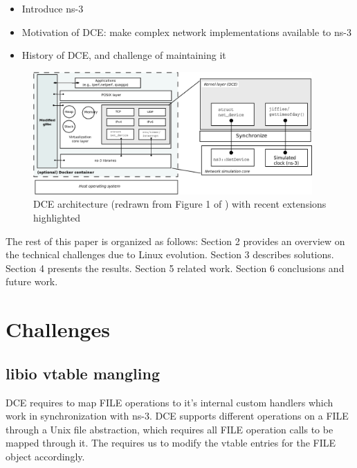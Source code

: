 \documentclass{sig-alternate}
\begin{document}
\begin{itemize}
\item Introduce ns-3
\item Motivation of DCE: make complex network implementations available to ns-3
\item History of DCE, and challenge of maintaining it
\end{itemize}

\begin{figure}[h!]
  \centering
    \includegraphics[width=0.95\textwidth]{figs/architecture.png}

  \caption{DCE architecture (redrawn from Figure 1 of \cite{Tazaki13}) with recent extensions highlighted}
  \label{fig:architecture}
\end{figure}

The rest of this paper is organized as follows: Section 2 provides an overview on the technical challenges due to Linux evolution.
Section 3 describes solutions.
Section 4 presents the results.  Section 5 related work.  Section 6 conclusions
and future work.

\section{Challenges}

\subsection{libio vtable mangling}
DCE requires to map FILE operations to it's internal custom handlers which work in synchronization with ns-3. DCE supports different operations on a FILE 
through a Unix file abstraction, which requires all FILE operation calls to be mapped through it. The requires us to modify the vtable entries for the FILE
object accordingly.
\end{document}

